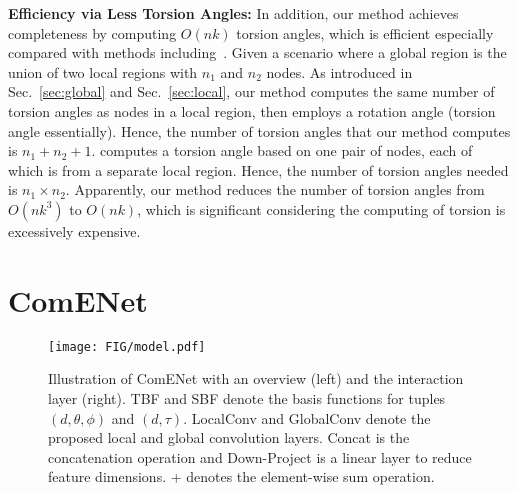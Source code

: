 \documentclass{article}
\begin{document}
\textbf{Efficiency via Less Torsion Angles:}
In addition, our method achieves completeness by
computing $O(nk)$ torsion angles, which is efficient especially 
compared with methods including~\citet{klicpera2021gemnet,adams2022learning,ganea2021geomol}.
Given a scenario where a global region is the union of two local regions with $n_1$ and $n_2$ nodes.
As introduced in Sec.~\ref{sec:global} and Sec.~\ref{sec:local}, our method computes the same number of torsion angles as nodes in a local region,
then employs a rotation angle (torsion angle essentially). Hence, the number of torsion angles that our method computes is $n_1+n_2+1$.
\citet{ganea2021geomol} computes a torsion angle
based on one pair of nodes, each of which is from a separate local region.
Hence, the number of torsion angles needed is $n_1\times n_2$.
Apparently, our method reduces the number of torsion angles from $O(nk^3)$ to $O(nk)$,
which is significant considering the computing of torsion is excessively expensive.

\section{ComENet} \label{sec:network}

\begin{wrapfigure}[22]{r}{0.6\textwidth}\vspace{-25 pt}
    \centering
    \texttt{[image: FIG/model.pdf]}
    \vspace{-18 pt}
    \caption{Illustration of ComENet with an overview (left) and the interaction layer (right).
    TBF and SBF denote the basis functions for tuples $(d,\theta,\phi)$ and $(d,\tau)$.
    LocalConv and GlobalConv denote the proposed local and global convolution layers.
    Concat is the concatenation operation and Down-Project is a linear layer to reduce feature dimensions.
    + denotes the element-wise sum operation.
    }\label{fig:model}
    \vspace{-20 pt}
\end{wrapfigure}
\end{document}
